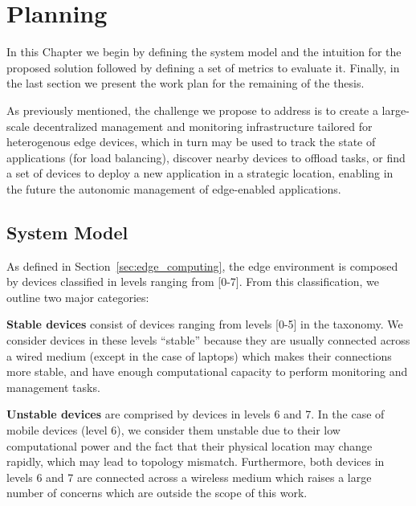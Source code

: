 \chapter{Planning} \label{cha:planning}

In this Chapter we begin by defining the system model and the intuition for the proposed solution followed by defining a set of metrics to evaluate it. Finally, in the last section we present the work plan for the remaining of the thesis. 

As previously mentioned, the challenge we propose to address is to create a large-scale decentralized management and monitoring infrastructure tailored for heterogenous edge devices, which in turn may be used to track the state of applications (for load balancing), discover nearby devices to offload tasks, or find a set of devices to deploy a new application in a strategic location, enabling in the future the autonomic management of edge-enabled applications.

\section{System Model}

As defined in Section~\ref{sec:edge_computing}, the edge environment is composed by devices classified in levels ranging from [0-7]. From this classification, we outline two major categories:  

\textbf{Stable devices} consist of devices ranging from levels [0-5] in the taxonomy. We consider devices in these levels ``stable'' because they are usually connected across a wired medium (except in the case of laptops) which makes their connections more stable, and have enough computational capacity to perform monitoring and management tasks. 

\textbf{Unstable devices} are comprised by devices in levels 6 and 7. In the case of mobile devices (level 6), we consider them unstable due to their low computational power and the fact that their physical location may change rapidly, which may lead to topology mismatch. Furthermore, both devices in levels 6 and 7 are connected across a wireless medium which raises a large number of concerns which are outside the scope of this work.

